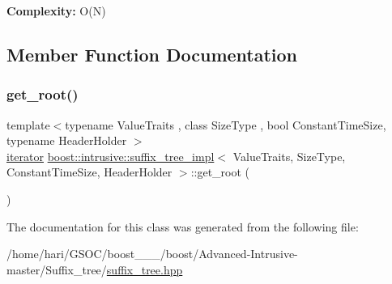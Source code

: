 {\bfseries  Complexity\+: } O(\+N) 

\subsection{Member Function Documentation}
\mbox{\label{classboost_1_1intrusive_1_1suffix__tree__impl_a76664f3f9926b5d5deb22b08ac964720}} 
\subsubsection{\texorpdfstring{get\+\_\+root()}{get\_root()}}
{\footnotesize\ttfamily template$<$typename Value\+Traits , class Size\+Type , bool Constant\+Time\+Size, typename Header\+Holder $>$ \\
\hyperlink{classboost_1_1intrusive_1_1suffix__tree__impl_a2df3b52dced59346b59db470e93ba87c}{iterator} \hyperlink{classboost_1_1intrusive_1_1suffix__tree__impl}{boost\+::intrusive\+::suffix\+\_\+tree\+\_\+impl}$<$ Value\+Traits, Size\+Type, Constant\+Time\+Size, Header\+Holder $>$\+::get\+\_\+root (\begin{DoxyParamCaption}{ }\end{DoxyParamCaption})\hspace{0.3cm}{\ttfamily [inline]}}



The documentation for this class was generated from the following file\+:\begin{DoxyCompactItemize}
\item 
/home/hari/\+G\+S\+O\+C/boost\+\_\+\_\+\_/boost/\+Advanced-\/\+Intrusive-\/master/\+Suffix\+\_\+tree/\hyperlink{suffix__tree_8hpp}{suffix\+\_\+tree.\+hpp}\end{DoxyCompactItemize}
